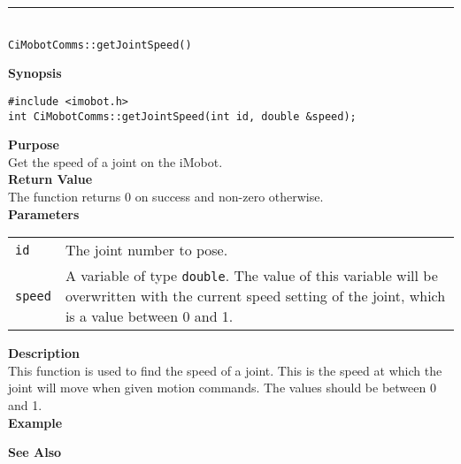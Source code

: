 \noindent
\vspace{5pt}
\rule{4.5in}{0.015in}\\
\noindent
{\LARGE \texttt{CiMobotComms::getJointSpeed()}}\\
{}

\noindent
{\bf Synopsis}\\
\begin{verbatim}
#include <imobot.h>
int CiMobotComms::getJointSpeed(int id, double &speed);
\end{verbatim}

\noindent
{\bf Purpose}\\
Get the speed of a joint on the iMobot.\\

\noindent
{\bf Return Value}\\
The function returns 0 on success and non-zero otherwise.\\

\noindent
{\bf Parameters}
\vspace{-0.1in}
\begin{description}
\item               
\begin{tabular}{p{10 mm}p{145 mm}}
\texttt{id} & The joint number to pose. \\
\texttt{speed} & A variable of type \texttt{double}. The value of this variable
will be overwritten with the current speed setting of the joint, which is a
value between 0 and 1.
\end{tabular}
\end{description}

\noindent
{\bf Description}\\
This function is used to find the speed of a joint.  This is the speed at which the joint will move when given motion commands. The values should be between 0 and 1. \\

\noindent
{\bf Example}\\
\noindent

\noindent
{\bf See Also}\\

